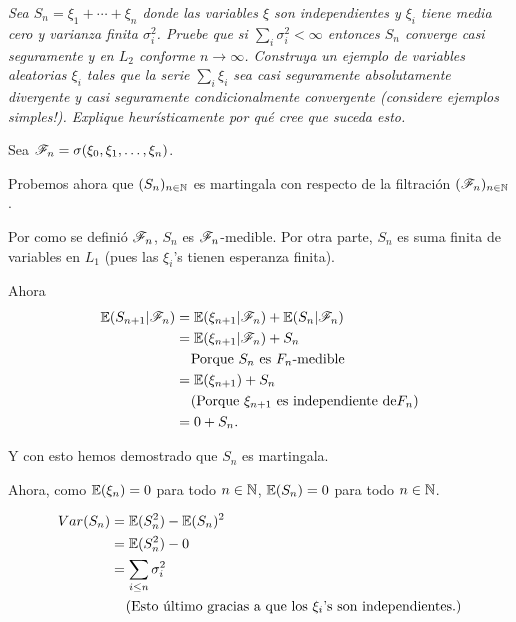\emph{
    Sea $S_n=\xi_1+\cdots+\xi_n$ donde las variables $\xi$ son independientes y $\xi_i$ tiene 
    media cero y varianza finita $\sigma_i^2$. Pruebe que si $\sum_i \sigma_i^2<\infty$ entonces 
    $S_n$ converge casi seguramente y en $L_2$ conforme $n\to\infty$. Construya un ejemplo de 
    variables aleatorias $\xi_i$ tales que la serie $\sum_i \xi_i$ sea casi seguramente absolutamente 
    divergente y casi seguramente condicionalmente convergente (considere ejemplos simples!). 
    Explique heur\'isticamente por qu\'e cree que suceda esto.
}

\afterstatement\par\null

Sea $\mathscr{F}_n = \sigma( \xi_0, \xi_1, \dots, \xi_n)$.\par\null


Probemos ahora que $(S_n)_{n \in \mathbb{N}}$ es martingala con respecto de la \newline 
filtración $(\mathscr{F}_n)_{n \in \mathbb{N}}$.\par\null

Por como se definió $\mathscr{F}_n$, $S_n$ es $\mathscr{F}_n$-medible. Por otra parte, $S_n$ es suma finita de variables en $L_1$ 
(pues las $\xi_i$'s tienen esperanza finita).

Ahora
\begin{align}
    \mathbb{E}(S_{n+1} | \mathscr{F}_n)  &=  \mathbb{E}(\xi_{n+1} | \mathscr{F}_n) + \mathbb{E}(S_n | \mathscr{F}_n)                       \\
                        &=  \mathbb{E}(\xi_{n+1} | \mathscr{F}_n) + S_n                                  \\
                        &\;\;\;\;\mbox{Porque $S_n$ es $F_n$-medible}                   \\
                        &=  \mathbb{E}(\xi_{n+1}) + S_n                                         \\
                        &\;\;\;\;\mbox{(Porque $\xi_{n+1}$ es independiente de$F_n$)}        	\\
                        &=  0 + S_n.                                                    \\
\end{align}\par\null

Y con esto hemos demostrado que $S_n$ es martingala.\par\null

Ahora, como $\mathbb{E}(\xi_n) = 0$ para todo $n \in \mathbb{N}$, $\mathbb{E}(S_n) = 0$ para todo $n \in \mathbb{N}$.

\begin{align}
        Var(S_n)    &=  \mathbb{E}(S_n^2) - \mathbb{E}(S_n)^2                                               \\
                    &=  \mathbb{E}(S_n^2) - 0                                                       \\
                    &=  \sum_{i \leq n} \sigma_i^2                                          \\
                    &\;\;\;\;\mbox{(Esto último gracias a que los $\xi_i$'s son independientes.)}
\end{align}
